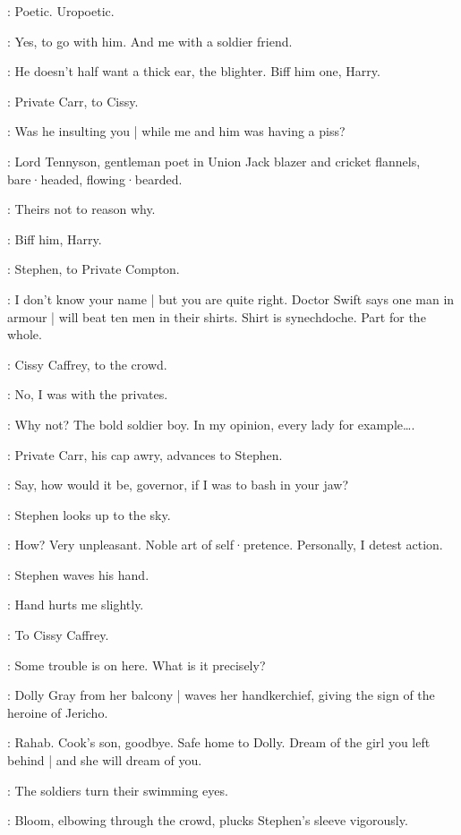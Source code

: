 \Stephen:
Poetic.
Uropoetic.

\Cissy:
Yes,
to go with him.
%
And me with a soldier friend.

\Compton[7b]:
He doesn't half want a thick ear,
the blighter.
Biff him one,
Harry.

:
Private Carr,
to Cissy.

\Carr:
Was he insulting you |
while me and him was having a piss?

:
Lord Tennyson,
gentleman poet in Union Jack blazer and cricket flannels,
bare·headed,
flowing·bearded.

\LordTennyson:
Theirs not to reason why.

\Compton:
Biff him,
Harry.

:
Stephen,
to Private Compton.

\Stephen:
I don't know your name |
but you are quite right.
Doctor Swift says one man in armour |
will beat ten men in their shirts.
Shirt is synechdoche.
Part for the whole.

:
Cissy Caffrey,
to the crowd.

\Cissy:
No,
I was with the privates.

\Stephen:
Why not?
The bold soldier boy.
In my opinion,
every lady for example….

:
Private Carr,
his cap awry,
advances to Stephen.

\Carr:
Say,
how would it be,
governor,
if I was to bash in your jaw?

:
Stephen looks up to the sky.

\Stephen:
How?
Very unpleasant.
Noble art of self·pretence.
Personally,
I detest action.

:
Stephen waves his hand.

\Stephen:
Hand hurts me slightly.

:
To Cissy Caffrey.

\Stephen:
Some trouble is on here.
What is it precisely?

:
Dolly Gray from her balcony |
waves her handkerchief,
giving the sign of the heroine of Jericho.

\DollyGray:
Rahab.
Cook's son,
goodbye.
Safe home to Dolly.
Dream of the girl you left behind |
%
and she will dream of you.

:
The soldiers turn their swimming eyes.

:
Bloom,
elbowing through the crowd,
plucks Stephen's sleeve vigorously.

